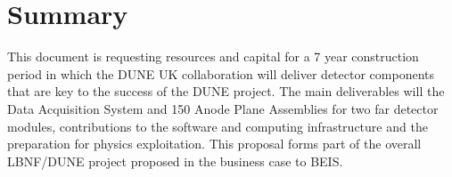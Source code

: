 \section*{Summary}
This document is requesting resources and capital for a 7 year construction period in which the DUNE UK collaboration will deliver detector components that are key to the success of the DUNE project. The main deliverables will the Data Acquisition System and 150 Anode Plane Assemblies for two far detector modules, contributions to the software and computing infrastructure and the preparation for physics exploitation. This  proposal forms part of the overall LBNF/DUNE project proposed in the business case to BEIS.

\thispagestyle{empty}

\newpage
\thispagestyle{empty}
\setcounter{page}{1}

\setcounter{tocdepth}{2}
\tableofcontents